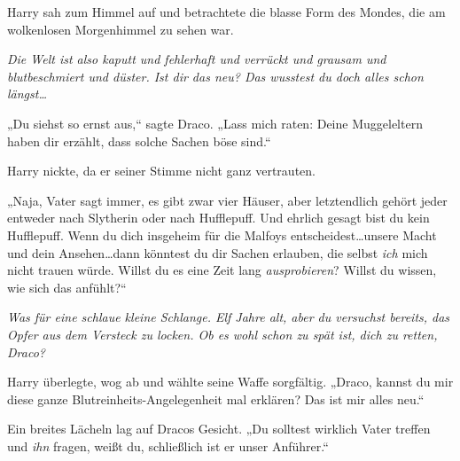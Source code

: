 Harry sah zum Himmel auf und betrachtete die blasse Form des Mondes, die am wolkenlosen Morgenhimmel zu sehen war.

\emph{Die Welt ist also kaputt und fehlerhaft und verrückt und grausam und blutbeschmiert und düster. Ist dir das neu? Das wusstest du doch alles schon längst…}

„Du siehst so ernst aus,“ sagte Draco. „Lass mich raten: Deine Muggeleltern haben dir erzählt, dass solche Sachen böse sind.“

Harry nickte, da er seiner Stimme nicht ganz vertrauten.

„Naja, Vater sagt immer, es gibt zwar vier Häuser, aber letztendlich gehört jeder entweder nach Slytherin oder nach Hufflepuff. Und ehrlich gesagt bist du kein Hufflepuff. Wenn du dich insgeheim für die Malfoys entscheidest…unsere Macht und dein Ansehen…dann könntest du dir Sachen erlauben, die selbst \emph{ich} mich nicht trauen würde. Willst du es eine Zeit lang \emph{ausprobieren}? Willst du wissen, wie sich das anfühlt?“

\emph{Was für eine schlaue kleine Schlange. Elf Jahre alt, aber du versuchst bereits, das Opfer aus dem Versteck zu locken. Ob es wohl schon zu spät ist, dich zu retten, Draco?}

Harry überlegte, wog ab und wählte seine Waffe sorgfältig. „Draco, kannst du mir diese ganze Blutreinheits-Angelegenheit mal erklären? Das ist mir alles neu.“

Ein breites Lächeln lag auf Dracos Gesicht. „Du solltest wirklich Vater treffen und \emph{ihn} fragen, weißt du, schließlich ist er unser Anführer.“

